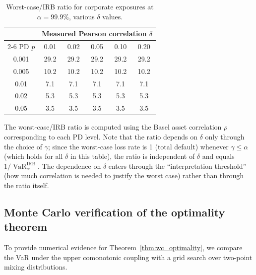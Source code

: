 \documentclass[11pt]{article}
\theoremstyle{definition}
\newcommand{\VaR}{\operatorname{VaR}}
\newcommand{\1}{\mathbf{1}}
\begin{document}
\begin{table}[h]
\centering
\caption{Worst-case/IRB ratio for corporate exposures at $\alpha = 99.9\%$, various $\delta$ values.}
\label{tab:irb_extended}
\begin{tabular}{cccccc}
\toprule
& \multicolumn{5}{c}{Measured Pearson correlation $\delta$} \\
\cmidrule{2-6}
PD $p$ & 0.01 & 0.02 & 0.05 & 0.10 & 0.20 \\
\midrule
0.001 & 29.2 & 29.2 & 29.2 & 29.2 & 29.2 \\
0.005 & 10.2 & 10.2 & 10.2 & 10.2 & 10.2 \\
0.01  & 7.1  & 7.1  & 7.1  & 7.1  & 7.1 \\
0.02  & 5.3  & 5.3  & 5.3  & 5.3  & 5.3 \\
0.05  & 3.5  & 3.5  & 3.5  & 3.5  & 3.5 \\
\bottomrule
\end{tabular}
\begin{flushleft}
\small The worst-case/IRB ratio is computed using the Basel asset correlation $\rho$ corresponding to each PD level. Note that the ratio depends on $\delta$ only through the choice of $\gamma$; since the worst-case loss rate is 1 (total default) whenever $\gamma \leq \alpha$ (which holds for all $\delta$ in this table), the ratio is independent of $\delta$ and equals $1/\VaR_\alpha^{\mathrm{IRB}}$. The dependence on $\delta$ enters through the ``interpretation threshold'' (how much correlation is needed to justify the worst case) rather than through the ratio itself.
\end{flushleft}
\end{table}

\subsection{Monte Carlo verification of the optimality theorem}

To provide numerical evidence for Theorem~\ref{thm:wc_optimality}, we compare the VaR under the upper comonotonic coupling with a grid search over two-point mixing distributions.
\end{document}
